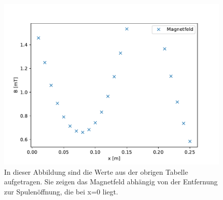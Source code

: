 \documentclass[titlepage = firstcover]{scrartcl}
\begin{document}
            \begin{figure}[h]
                \centering
                \includegraphics{HelmholtzC.pdf}
                \caption{In dieser Abbildung sind die Werte aus der obrigen Tabelle aufgetragen. Sie zeigen das Magnetfeld abhängig von der Entfernung zur Spulenöffnung, die bei x=0 liegt.}
                \label{fig:HelmholtzC}

            \end{figure}

            \FloatBarrier
            \newpage
                
\end{document}
